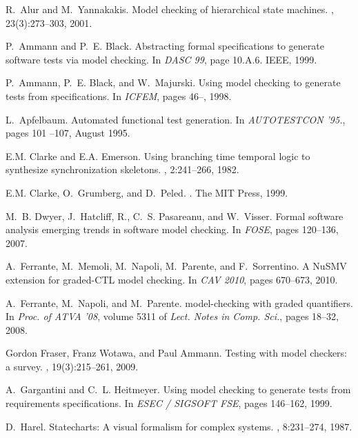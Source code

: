 \documentclass[letterpaper,twocolumn,10pt]{article}
\begin{document}
\begin{thebibliography}{10}

R.~Alur and M.~Yannakakis.
\newblock Model checking of hierarchical state machines.
, 23(3):273--303, 2001.

P.~Ammann and P.~E. Black.
\newblock Abstracting formal specifications to generate software tests via
  model checking.
\newblock In {\em DASC 99}, page 10.A.6. IEEE, 1999.

P.~Ammann, P.~E. Black, and W.~Majurski.
\newblock Using model checking to generate tests from specifications.
\newblock In {\em ICFEM}, pages 46--, 1998.

L.~Apfelbaum.
\newblock Automated functional test generation.
\newblock In {\em AUTOTESTCON '95.}, pages 101 --107, August 1995.

E.M. Clarke and E.A. Emerson.
\newblock Using branching time temporal logic to synthesize synchronization
  skeletons.
, 2:241--266, 1982.

E.M. Clarke, O.~Grumberg, and D.~Peled.
.
\newblock The MIT Press, 1999.

M.~B. Dwyer, J.~Hatcliff, R., C.~S. Pasareanu, and W.~Visser.
\newblock Formal software analysis emerging trends in software model checking.
\newblock In {\em FOSE}, pages 120--136, 2007.

A.~Ferrante, M.~Memoli, M.~Napoli, M.~Parente, and F.~Sorrentino.
\newblock A {NuSMV} extension for graded-{CTL} model checking.
\newblock In {\em CAV 2010}, pages 670--673, 2010.

A.~Ferrante, M.~Napoli, and M.~Parente.
 model-checking with graded quantifiers.
\newblock In {\em Proc. of ATVA '08}, volume 5311 of {\em Lect. Notes in Comp.
  Sci.}, pages 18--32, 2008.

Gordon Fraser, Franz Wotawa, and Paul Ammann.
\newblock Testing with model checkers: a survey.
, 19(3):215--261, 2009.

A.~Gargantini and C.~L. Heitmeyer.
\newblock Using model checking to generate tests from requirements
  specifications.
\newblock In {\em ESEC / SIGSOFT FSE}, pages 146--162, 1999.

D.~Harel.
\newblock Statecharts: A visual formalism for complex systems.
, 8:231--274, 1987.


\end{thebibliography}
\end{document}

